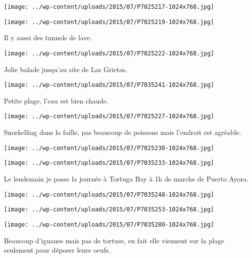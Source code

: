  \newline
\centerline{\texttt{[image: ../wp-content/uploads/2015/07/P7025217-1024x768.jpg]} } 
\newline
\centerline{\texttt{[image: ../wp-content/uploads/2015/07/P7025219-1024x768.jpg]} } 
 \newline
 Il y aussi des tunnels de lave. \newline
 \newline
\centerline{\texttt{[image: ../wp-content/uploads/2015/07/P7025222-1024x768.jpg]} } 
 \newline
 Jolie balade jusqu'au site de Las Grietas. \newline
 \newline
\centerline{\texttt{[image: ../wp-content/uploads/2015/07/P7035241-1024x768.jpg]} } 
 \newline
 Petite plage, l'eau est bien chaude. \newline
 \newline
\centerline{\texttt{[image: ../wp-content/uploads/2015/07/P7025227-1024x768.jpg]} } 
 \newline
 Snorkelling dans la faille, pas beaucoup de poissons mais l'endroit est agréable. \newline
 \newline
\centerline{\texttt{[image: ../wp-content/uploads/2015/07/P7025230-1024x768.jpg]} } 
 \newline
 \newline
\centerline{\texttt{[image: ../wp-content/uploads/2015/07/P7035233-1024x768.jpg]} } 
 \newline
 Le lendemain je passe la journée à Tortuga Bay à 1h de marche de Puerto Ayora. \newline
 \newline
\centerline{\texttt{[image: ../wp-content/uploads/2015/07/P7035248-1024x768.jpg]} } 
 \newline
 \newline
\centerline{\texttt{[image: ../wp-content/uploads/2015/07/P7035253-1024x768.jpg]} } 
 \newline
 \newline
\centerline{\texttt{[image: ../wp-content/uploads/2015/07/P7035280-1024x768.jpg]} } 
 \newline
 Beaucoup d'iguanes mais pas de tortues, en fait elle viennent sur la plage seulement pour déposer leurs oeufs. \newline
